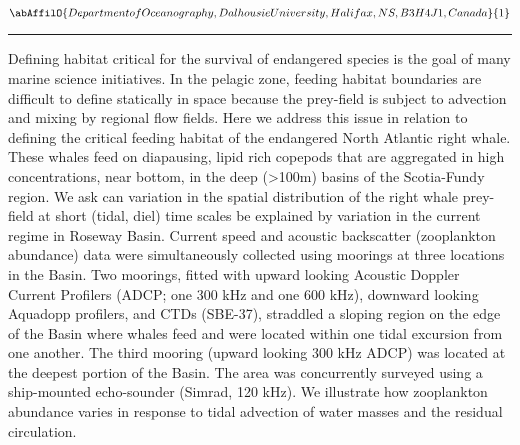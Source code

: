 \begin{minipage}{\linewidth}\begin{center}\begin{minipage}{\linewidth}
   \vspace{2 mm} \begin{center}
    \vspace{2 mm}\begin{center}
  
  $\abAffilO{Department of Oceanography, Dalhousie University, Halifax, NS, B3H 4J1, Canada}{1}$

  \end{center}
  \vspace{2 mm}
  \end{center}\end{minipage}\end{center}
  \begin{center}\rule{0.70\linewidth}{0.5 pt}\end{center}
  \begin{minipage}{\linewidth}
\noindent Defining habitat critical for the survival of endangered species is the goal of many marine science initiatives. In the pelagic zone, feeding habitat boundaries are difficult to define statically in space because the prey-field is subject to advection and mixing by regional flow fields. Here we address this issue in relation to defining the critical feeding habitat of the endangered North Atlantic right whale. These whales feed on diapausing, lipid rich copepods that are aggregated in high concentrations, near bottom, in the deep (>100m) basins of the Scotia-Fundy region. We ask can variation in the spatial distribution of the right whale prey-field at short (tidal, diel) time scales be explained by variation in the current regime in Roseway Basin. Current speed and acoustic backscatter (zooplankton abundance) data were simultaneously collected using moorings at three locations in the Basin. Two moorings, fitted with upward looking Acoustic Doppler Current Profilers (ADCP; one 300 kHz and one 600 kHz), downward looking Aquadopp profilers, and CTDs (SBE-37), straddled a sloping region on the edge of the Basin where whales feed and were located within one tidal excursion from one another. The third mooring (upward looking 300 kHz ADCP) was located at the deepest portion of the Basin. The area was concurrently surveyed using a ship-mounted echo-sounder (Simrad, 120 kHz). We illustrate how zooplankton abundance varies in response to tidal advection of water masses and the residual circulation. 
\end{minipage}\end{minipage}
